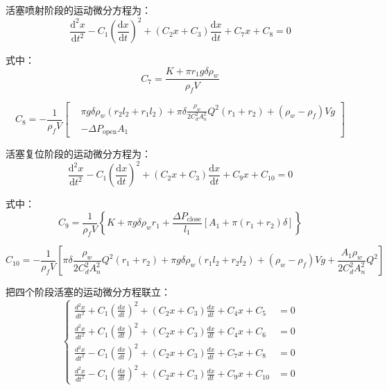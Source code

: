  活塞喷射阶段的运动微分方程为：
  \begin{equation}\label{eq:piston_dynamic2}
\frac{\mathrm{d}^2 x}{\mathrm{d}t^2}-C_1\left(\frac{\mathrm{d}x}{\mathrm{d}t}\right)^2 +(C_2 x+C_3)\frac{\mathrm{d}x}{\mathrm{d}t}+C_7 x +C_8=0
\end{equation}

  式中：
  \begin{equation}\label{eq:C7}
C_7=\frac{K+\pi r_1 g \delta \rho_w}{\rho_f V}
\end{equation}

  \begin{equation}\label{eq:C8}
C_8 = -\frac{1}{\rho_f V}
\left[
\begin{aligned}
&\pi g \delta \rho_w (r_2 l_2 + r_1 l_2) + \pi \delta \frac{\rho_w}{2C_d^2 A_n^2} Q^2 (r_1 + r_2) + (\rho_w - \rho_f) V g \\
&- \Delta P_{\mathrm{open}} A_1
\end{aligned}
\right]
\end{equation}

活塞复位阶段的运动微分方程为：
\begin{equation}\label{eq:piston_dynamic3}
\frac{\mathrm{d}^2 x}{\mathrm{d}t^2}-C_1\left(\frac{\mathrm{d}x}{\mathrm{d}t}\right)^2 +(C_2 x+C_3)\frac{\mathrm{d}x}{\mathrm{d}t}+C_9 x +C_{10}=0
\end{equation}


式中：
\begin{equation}\label{eq:C9}
C_9 = \frac{1}{\rho_f V}
\left\{
K + \pi g \delta \rho_w r_1
+ \frac{\Delta P_{\mathrm{close}}}{l_1}
\left[ A_1 + \pi (r_1 + r_2)\delta \right]
\right\}
\end{equation}

\begin{equation}\label{eq:C10}
C_{10} = -\frac{1}{\rho_f V}
\left[
\pi\delta \frac{\rho_w}{2C_d^2 A_n^2} Q^2 (r_1+r_2)
+ \pi g \delta \rho_w (r_1 l_2 + r_2 l_2)
+ (\rho_w-\rho_f) V g
+ \frac{A_1 \rho_w}{2C_d^2 A_n^2} Q^2
\right]
\end{equation}


把四个阶段活塞的运动微分方程联立：
\begin{equation}
\left\{
\begin{aligned}
\frac{d^2 x}{dt^2} + C_1 \left(\frac{dx}{dt}\right)^2 + (C_2 x + C_3)\frac{dx}{dt} + C_4 x + C_5 &= 0 \\
\frac{d^2 x}{dt^2} + C_1 \left(\frac{dx}{dt}\right)^2 + (C_2 x + C_3)\frac{dx}{dt} + C_4 x + C_6 &= 0 \\
\frac{d^2 x}{dt^2} - C_1 \left(\frac{dx}{dt}\right)^2 + (C_2 x + C_3)\frac{dx}{dt} + C_7 x + C_8 &= 0 \\
\frac{d^2 x}{dt^2} - C_1 \left(\frac{dx}{dt}\right)^2 + (C_2 x + C_3)\frac{dx}{dt} + C_9 x + C_{10} &= 0
\end{aligned}
\right.
\end{equation}


